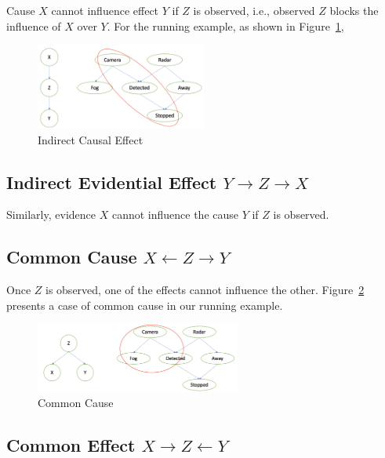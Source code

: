 Cause $X$ cannot influence effect $Y$ if $Z$ is observed, i.e.,  observed $Z$ blocks the influence of $X$ over $Y$. For the running example, as shown in Figure~\ref{fig:indirect-causal}, 


\begin{figure}[!htbp]
    \centering
    \includegraphics[width=0.5\textwidth]{images/graphical models/d-sep/indirect-causal.png}
    \caption{Indirect Causal Effect}
    \label{fig:indirect-causal}
\end{figure}

\subsection*{Indirect Evidential Effect $Y\rightarrow Z\rightarrow X$} Similarly, evidence $X$ cannot influence the cause $Y$ if $Z$ is observed. 


\subsection*{Common Cause $X\leftarrow Z\rightarrow Y$}

Once $Z$ is observed, one of the effects cannot influence the other.  Figure~\ref{fig:common-cause} presents a case of common cause in our running example. 

\begin{figure}[!htbp]
    \centering
    \includegraphics[width=0.6\textwidth]{images/graphical models/d-sep/common-cause.png}
    \caption{Common Cause}
    \label{fig:common-cause}
\end{figure}

\subsection*{Common Effect $X\rightarrow Z\leftarrow Y$} 

